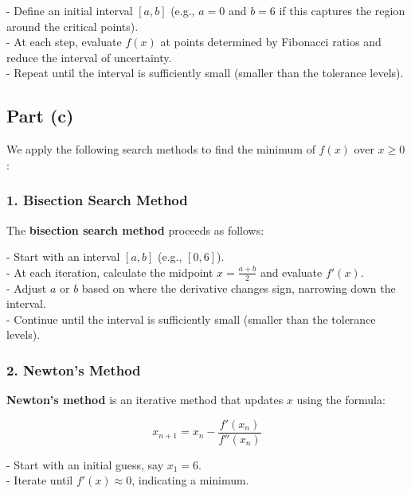 \documentclass{article}
\begin{document}
- Define an initial interval \( [a, b] \) (e.g., \( a = 0 \) and \( b = 6 \) if this captures the region around the critical points). \\
- At each step, evaluate \( f(x) \) at points determined by Fibonacci ratios and reduce the interval of uncertainty. \\
- Repeat until the interval is sufficiently small (smaller than the tolerance levels).

\subsection*{Part (c)}

We apply the following search methods to find the minimum of \( f(x) \) over \( x \geq 0 \):

\subsubsection*{1. Bisection Search Method}
The \textbf{bisection search method} proceeds as follows:

- Start with an interval \( [a, b] \) (e.g., \( [0, 6] \)). \\
- At each iteration, calculate the midpoint \( x = \frac{a + b}{2} \) and evaluate \( f'(x) \). \\
- Adjust \( a \) or \( b \) based on where the derivative changes sign, narrowing down the interval. \\
- Continue until the interval is sufficiently small (smaller than the tolerance levels).

\subsubsection*{2. Newton's Method}
\textbf{Newton’s method} is an iterative method that updates \( x \) using the formula:

\[
x_{n+1} = x_n - \frac{f'(x_n)}{f''(x_n)}
\]

- Start with an initial guess, say \( x_1 = 6 \). \\
- Iterate until \( f'(x) \approx 0 \), indicating a minimum.
\end{document}
